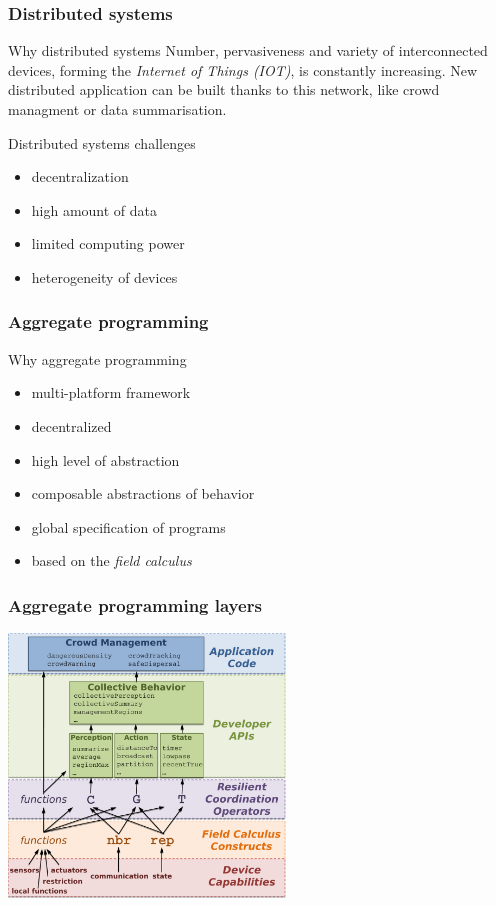 

\maketitle

\begin{frame}
\frametitle{Distributed systems}
\begin{block}{Why distributed systems}
Number, pervasiveness and variety of interconnected devices, forming the \textit{Internet of Things (IOT)}, is constantly increasing. New distributed application can be built thanks to this network, like crowd managment or data summarisation.
\end{block}
\begin{block}{Distributed systems challenges}
\begin{itemize}
\item decentralization
\item high amount of data
\item limited computing power
\item heterogeneity of devices
\end{itemize}
\end{block}
\end{frame}

\begin{frame}
\frametitle{Aggregate programming}
\begin{block}{Why aggregate programming}
\begin{itemize}
\item multi-platform framework
\item decentralized
\item high level of abstraction
\item composable abstractions of behavior
\item global specification of programs
\item based on the \textit{field calculus}
\end{itemize}
\end{block}
\end{frame}

\begin{frame}
\centering
\frametitle{Aggregate programming layers}
\includegraphics[height=7cm]{imgs/layers.pdf}
\end{frame}

